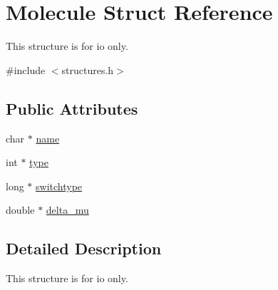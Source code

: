 \hypertarget{struct_molecule}{\section{Molecule Struct Reference}
\label{struct_molecule}
}


This structure is for io only.  




{\ttfamily \#include $<$structures.\+h$>$}

\subsection*{Public Attributes}
\begin{DoxyCompactItemize}
\item 
char $\ast$ \hyperlink{struct_molecule_a905da45fb2ad1c821b7cf03c655c3047}{name}
\item 
int $\ast$ \hyperlink{struct_molecule_aa968965732a78fc8b2b60fc27d6374b6}{type}
\item 
long $\ast$ \hyperlink{struct_molecule_acf6cf0f43a015cff8dde7970e1ca3abd}{switchtype}
\item 
double $\ast$ \hyperlink{struct_molecule_a6fd83a87d28a34e7098dc9d9f22b6c41}{delta\+\_\+mu}
\end{DoxyCompactItemize}


\subsection{Detailed Description}
This structure is for io only. 

